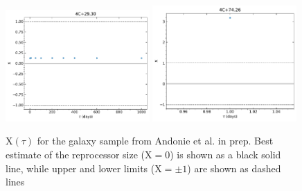 \begin{figure}
\begin{center}
{  \includegraphics[width=0.49\textwidth]{Figs/Chapter5/X_tau/X_tau_4C+29.30.pdf} \hfill 
  \includegraphics[width=0.49\textwidth]{Figs/Chapter5/X_tau/X_tau_4C+74.26.pdf} \hfill \\
  \caption{X$(\tau)$ for the galaxy sample from Andonie et al. in prep. Best estimate of the reprocessor size (X$=0$) is shown as a black solid line, while upper and lower limits (X$=\pm1$) are shown as dashed lines}
    \label{fig:Xtau_1}
  }
\end{center}
\end{figure}

